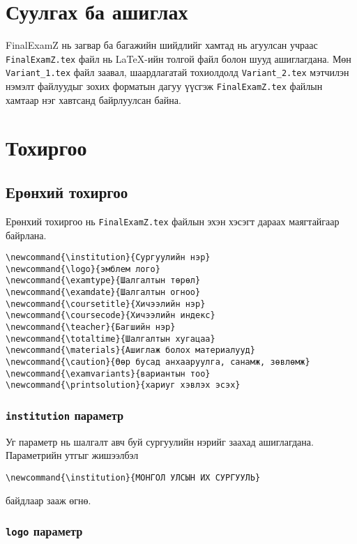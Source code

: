 \documentclass[10pt]{article}
\theoremstyle{definition}
\begin{document}
\section{Суулгах ба ашиглах}

FinalExamZ нь загвар ба багажийн шийдлийг хамтад нь агуулсан учраас \texttt{FinalExamZ.tex} файл нь \LaTeX-ийн толгой файл болон шууд ашиглагдана. Мөн \texttt{Variant\_1.tex} файл заавал, шаардлагатай тохиолдолд \texttt{Variant\_2.tex} мэтчилэн нэмэлт файлуудыг зохих форматын дагуу үүсгэж \texttt{FinalExamZ.tex} файлын хамтаар нэг хавтсанд байрлуулсан байна.

\section{Тохиргоо}

\subsection{Ерөнхий тохиргоо}

Ерөнхий тохиргоо нь \texttt{FinalExamZ.tex} файлын эхэн хэсэгт дараах маягтайгаар байрлана.
\begin{verbatim}
\newcommand{\institution}{Сургуулийн нэр}
\newcommand{\logo}{эмблем лого}
\newcommand{\examtype}{Шалгалтын төрөл}
\newcommand{\examdate}{Шалгалтын огноо}
\newcommand{\coursetitle}{Хичээлийн нэр}
\newcommand{\coursecode}{Хичээлийн индекс}
\newcommand{\teacher}{Багшийн нэр}
\newcommand{\totaltime}{Шалгалтын хугацаа}
\newcommand{\materials}{Ашиглаж болох материалууд}
\newcommand{\caution}{Өөр бусад анхааруулга, санамж, зөвлөмж}
\newcommand{\examvariants}{вариантын тоо}
\newcommand{\printsolution}{хариуг хэвлэх эсэх}
\end{verbatim}

\subsubsection{\texttt{institution} параметр}

Уг параметр нь шалгалт авч буй сургуулийн нэрийг заахад ашиглагдана. Параметрийн утгыг жишээлбэл 
\begin{verbatim}
\newcommand{\institution}{МОНГОЛ УЛСЫН ИХ СУРГУУЛЬ}
\end{verbatim}
байдлаар зааж өгнө.

\subsubsection{\texttt{logo} параметр}
\end{document}
